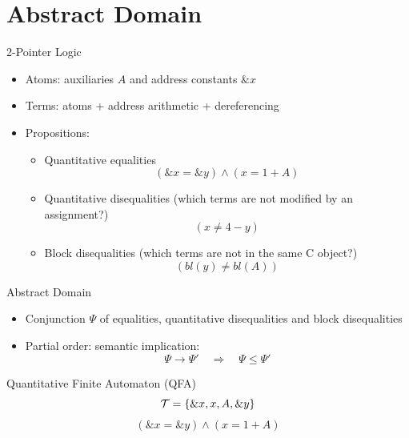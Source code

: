\documentclass[aspectratio=169]{beamer}
\begin{document}
\frame{\tableofcontents}

\section{Abstract Domain}


\begin{frame}{2-Pointer Logic}
    \begin{itemize}
        \item Atoms: auxiliaries $A$ and address constants $\&x$
        \pause
        \item Terms: atoms + address arithmetic + dereferencing
        \pause
        \item Propositions:
         \begin{itemize}
            \item Quantitative equalities
            \[
                (\&x = \&y) \land (x = 1 + A)
            \]
            \pause
      \item Quantitative disequalities (which terms are not modified by an assignment?)
            \[
                (x \neq 4 - y)
            \]
            \pause

      \item Block disequalities (which terms are not in the same C object?)
            \[
                (bl(y) \neq bl(A))
            \]
        \end{itemize}
    \end{itemize}
\end{frame}

\begin{frame}{Abstract Domain}
    \begin{itemize}

        \item Conjunction $\Psi$ of equalities, quantitative disequalities and block disequalities
        \item Partial order: semantic implication:
        \[
        \Psi \rightarrow \Psi' \quad\Rightarrow\quad  \Psi \leq \Psi'
        \]

    \end{itemize}
\end{frame}

\begin{frame}{Quantitative Finite Automaton (QFA)}
    \[
        \mathcal{T}=\{ \&x, x, A, \&y\}
    \]
    \[
        (\&x = \&y) \land (x = 1 + A)
        \]
    \centering
\end{frame}
\end{document}
